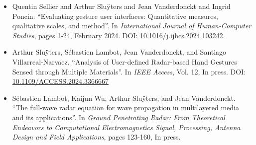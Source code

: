 {\begin{itemize}
    \item Quentin Sellier and Arthur Slu\"{y}ters and Jean Vanderdonckt and Ingrid Poncin. ``Evaluating gesture user interfaces: Quantitative measures, qualitative scales, and method''. In \textit{International Journal of Human-Computer Studies}, pages 1-24, February 2024. DOI: \href{https://doi.org/10.1016/j.ijhcs.2024.103242}{10.1016/j.ijhcs.2024.103242}. 

    \item Arthur Slu\"{y}ters, S\'{e}bastien Lambot, Jean Vanderdonckt, and Santiago Villarreal-Narvaez. ``Analysis of User-defined Radar-based Hand Gestures Sensed through Multiple Materials''. In \textit{IEEE Access}, Vol. 12, In press. DOI: \href{https://doi.org/10.1109/ACCESS.2024.3366667}{10.1109/ACCESS.2024.3366667}
    
    \item S\'{e}bastien Lambot, Kaijun Wu, Arthur Slu\"{y}ters, and Jean Vanderdonckt. ``The full-wave radar equation for wave propagation in multilayered media and its applications''. In \textit{Ground Penetrating Radar: From Theoretical Endeavors to Computational Electromagnetics Signal, Processing, Antenna Design and Field Applications}, pages 123-160, In press.
    
\end{itemize}
}